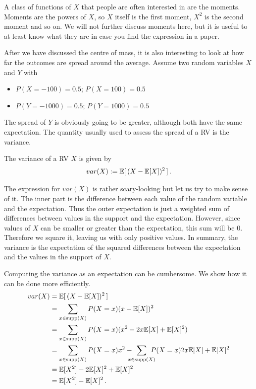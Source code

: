 A class of functions of $ X $ that people are often interested in are
the moments. Moments are the powers of $ X $, so $ X $ itself is the
first moment, $ X^{2} $ is the second moment and so on. We will not
further discuss moments here, but it is useful to at least know what
they are in case you find the expression in a paper.

\medskip
After we have discussed the centre of mass, it is also interesting to look at how far the outcomes are spread around the average. Assume two random variables $ X $ and $ Y $ with
\begin{itemize}
\item $ P(X=-100) = 0.5 $; $ P(X=100) = 0.5 $
\item $ P(Y=-1000) = 0.5 $; $ P(Y=1000) = 0.5 $
\end{itemize}
The spread of $ Y $ is obviously going to be greater, although both have the same expectation. The quantity usually used to assess
the spread of a RV is the variance.

\begin{Definition}[Variance]
The variance of a RV $ X $ is given by
$$ var(X) := \mathbb{E}[\, (X - \mathbb{E}[X])^{2} \, ] \, .$$
\end{Definition}

The expression for $ var(X) $ is rather scary-looking but let us try to make sense of it. The inner part is the difference between
each value of the random variable and the expectation. Thus the outer expectation is just a weighted sum of differences between 
values in the support and the expectation. However, since values of $ X $ can be smaller or greater than the expectation, this
sum will be 0. Therefore we square it, leaving us with only positive values. In summary, the variance is the expectation
of the squared differences between the expectation and the values in the support of $ X $.

Computing the variance as an expectation can be cumbersome. We show how it can be done more efficiently.
\begin{align}
var(X) &= \E[\, (X - \E[X])^{2} \, ] \\
&= \sum_{x \in \supp(X)} P(X=x) (x - \E[X])^{2} \\
&= \sum_{x \in \supp(X)} P(X=x) (x^2 - 2x\E[X] + \E[X]^{2}) \\
&= \sum_{x \in \supp(X)} P(X=x)  x^{2} -  \!\!\!\!\! \sum_{x \in \supp(X)} \!\!\!\!\! P(X=x) 2x\E[X] + \E[X]^{2} \\
&= \E[X^{2}] -   2 \E[X]^{2} + \E[X]^{2}  \\
&= \E[X^{2}] - \E[X]^{2} \, . \label{variance}
\end{align}


